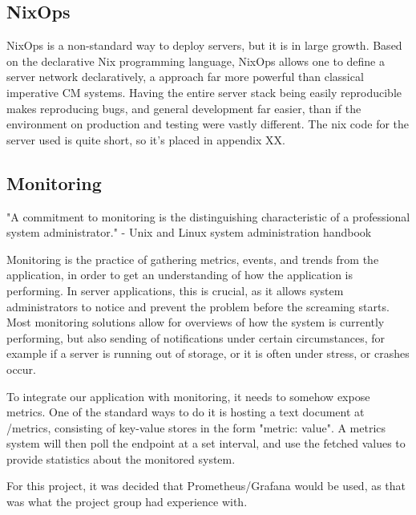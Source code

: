 \subsection{NixOps}
NixOps is a non-standard way to deploy servers, but it is in large growth.
Based on the declarative Nix programming language, NixOps allows one to define a server network declaratively, a approach far more powerful than classical imperative CM systems.
Having the entire server stack being easily reproducible makes reproducing bugs, and general development far easier, than if the environment on production and testing were vastly different.
The nix code for the server used is quite short, so it's placed in appendix XX.

\subsection{Monitoring}
"A commitment to monitoring is the distinguishing characteristic of a professional system administrator." - Unix and Linux system administration handbook

Monitoring is the practice of gathering metrics, events, and trends from the application, in order to get an understanding of how the application is performing.
In server applications, this is crucial, as it allows system administrators to notice and prevent the problem before the screaming starts.
Most monitoring solutions allow for overviews of how the system is currently performing, but also sending of notifications under certain circumstances, for example if a server is running out of storage, or it is often under stress, or crashes occur.

To integrate our application with monitoring, it needs to somehow expose metrics.
One of the standard ways to do it is hosting a text document at /metrics, consisting of key-value stores in the form "metric: value".
A metrics system will then poll the endpoint at a set interval, and use the fetched values to provide statistics about the monitored system.

For this project, it was decided that Prometheus/Grafana would be used, as that was what the project group had experience with.

